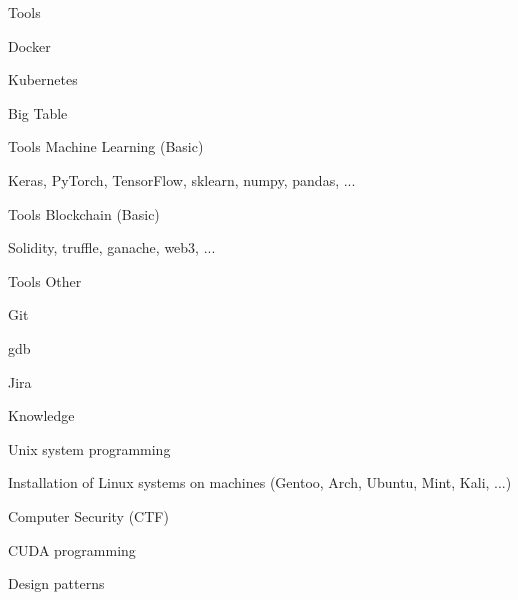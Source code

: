\begin{cventries}
  \cventry
  {Tools}
  {}
  {}
  {}
  {
    \begin{cvitems}
      \item {Docker}
      \item {Kubernetes}
      \item {Big Table}
    \end{cvitems}
  }

  \cventry
  {Tools}
  {Machine Learning (Basic)}
  {}
  {}
  {
    \begin{cvitems}
      \item {Keras, PyTorch, TensorFlow, sklearn, numpy, pandas, ...}
    \end{cvitems}
  }

  \cventry
  {Tools}
  {Blockchain (Basic)}
  {}
  {}
  {
    \begin{cvitems}
      \item {Solidity, truffle, ganache, web3, ...}
    \end{cvitems}
  }

  \cventry
  {Tools}
  {Other}
  {}
  {}
  {
    \begin{cvitems}
      \item {Git}
      \item {gdb}
      \item {Jira}
    \end{cvitems}
  }

  \cventry
  {Knowledge}
  {}
  {}
  {}
  {
    \begin{cvitems}
      \item {Unix system programming}
      \item {Installation of Linux systems on machines (Gentoo, Arch, Ubuntu, Mint, Kali, ...)}
      \item {Computer Security (CTF)}
      \item {CUDA programming}
      \item {Design patterns}
    \end{cvitems}
  }


\end{cventries}
